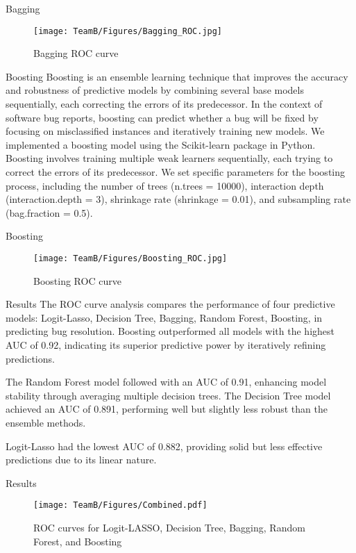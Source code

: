 \documentclass[10pt]{beamer}
\begin{document}
\begin{frame}[t]{Bagging}\justifying \vspace{1pt}
	\begin{figure}[htp]
		\centering
		\texttt{[image: TeamB/Figures/Bagging\_ROC.jpg]}
		\caption{Bagging ROC curve}
		\label{fig:picture1}
	\end{figure}
\end{frame}


\begin{frame}[t]{Boosting}\justifying \vspace{10pt}
	Boosting is an ensemble learning technique that improves the accuracy and robustness of predictive models by combining several base models sequentially, each correcting the errors of its predecessor. In the context of software bug reports, boosting can predict whether a bug will be fixed by focusing on misclassified instances and iteratively training new models. 
	\vskip 8pt
	We implemented a boosting model using the Scikit-learn package in Python. Boosting involves training multiple weak learners sequentially, each trying to correct the errors of its predecessor. We set specific parameters for the boosting process, including the number of trees (n.trees = 10000), interaction depth (interaction.depth = 3), shrinkage rate (shrinkage = 0.01), and subsampling rate (bag.fraction = 0.5).
\end{frame}

\begin{frame}[t]{Boosting}\justifying \vspace{0pt}
	\begin{figure}[htp]
		\centering
		\texttt{[image: TeamB/Figures/Boosting\_ROC.jpg]}
		\caption{Boosting ROC curve}
		\label{fig:picture1}
	\end{figure}
\end{frame}


\begin{frame}[t]{Results}\justifying \vspace{10pt}
The ROC curve analysis compares the performance of four predictive models: Logit-Lasso, Decision Tree, Bagging, Random Forest, Boosting, in predicting bug resolution. Boosting outperformed all models with the highest AUC of 0.92, indicating its superior predictive power by iteratively refining predictions. 

The Random Forest model followed with an AUC of 0.91, enhancing model stability through averaging multiple decision trees. The Decision Tree model achieved an AUC of 0.891, performing well but slightly less robust than the ensemble methods. 

Logit-Lasso had the lowest AUC of 0.882, providing solid but less effective predictions due to its linear nature.

 
\end{frame}


\begin{frame}[t]{Results}\justifying \vspace{1pt}
	\begin{figure}[htp]
		\centering
		\texttt{[image: TeamB/Figures/Combined.pdf]}
		\caption{ROC curves for Logit-LASSO, Decision Tree, Bagging, Random Forest, and Boosting}
		\label{fig:picture1}
	\end{figure}
\end{frame}
\end{document}
